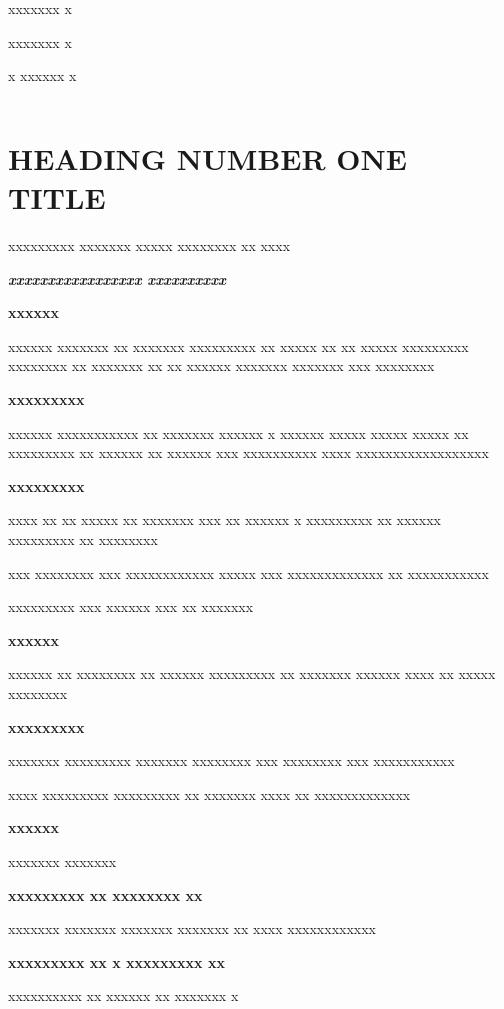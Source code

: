 \documentclass[11pt,a4paper]{article}
\begin{document}
xxxxxxx x

xxxxxxx x

x xxxxxx x

\begin{table}[h]
\begin{tabular}{|l|}
\hline
 \\ \hline
\end{tabular}
\end{table}

\section{HEADING NUMBER ONE TITLE}

xxxxxxxxx xxxxxxx xxxxx xxxxxxxx xx xxxx

\textit{\textbf{xxxxxxxxxxxxxxxxx xxxxxxxxxx}}

\textbf{xxxxxx}

xxxxxx xxxxxxx xx xxxxxxx xxxxxxxxx xx xxxxx xx xx xxxxx xxxxxxxxx xxxxxxxx xx xxxxxxx xx xx xxxxxx xxxxxxx xxxxxxx xxx xxxxxxxx

\textbf{xxxxxxxxx}

xxxxxx xxxxxxxxxxx xx xxxxxxx xxxxxx x xxxxxx xxxxx xxxxx xxxxx xx xxxxxxxxx xx xxxxxx xx xxxxxx xxx xxxxxxxxxx xxxx xxxxxxxxxxxxxxxxxx

\textbf{xxxxxxxxx}

xxxx xx xx xxxxx xx xxxxxxx xxx  xx xxxxxx x xxxxxxxxx xx xxxxxx xxxxxxxxx xx xxxxxxxx

xxx xxxxxxxx xxx xxxxxxxxxxxx xxxxx xxx xxxxxxxxxxxxx xx xxxxxxxxxxx

xxxxxxxxx xxx xxxxxx xxx xx xxxxxxx

\textbf{xxxxxx}

xxxxxx xx xxxxxxxx xx xxxxxx xxxxxxxxx xx xxxxxxx xxxxxx xxxx xx xxxxx xxxxxxxx

\textbf{xxxxxxxxx}

xxxxxxx xxxxxxxxx xxxxxxx xxxxxxxx xxx xxxxxxxx xxx xxxxxxxxxxx

xxxx xxxxxxxxx xxxxxxxxx xx xxxxxxx xxxx xx xxxxxxxxxxxxx

\textbf{xxxxxx}

xxxxxxx xxxxxxx

\textbf{xxxxxxxxx	xx xxxxxxxx xx}

xxxxxxx xxxxxxx xxxxxxx xxxxxxx xx xxxx xxxxxxxxxxxx

\textbf{xxxxxxxxx  	xx x xxxxxxxxx xx}

xxxxxxxxxx xx xxxxxx xx xxxxxxx x
\end{document}
